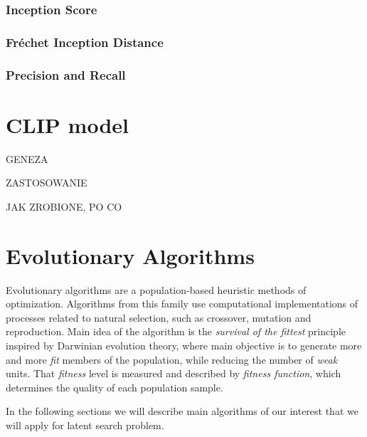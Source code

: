 \documentclass[12pt,a4paper,openany]{book}
\begin{document}



\subsubsection*{Inception Score}
\subsubsection*{Fr\'echet Inception Distance}
\subsubsection*{Precision and Recall}

\section{CLIP model}

GENEZA

ZASTOSOWANIE

JAK ZROBIONE, PO CO


\section{Evolutionary Algorithms}

Evolutionary algorithms are a population-based heuristic methods of optimization. Algorithms from this family use computational implementations of processes related to natural selection, such as crossover, mutation and reproduction. Main idea of the algorithm is the \textit{survival of the fittest} principle inspired by Darwinian evolution theory, where main objective is to generate more and more \textit{fit} members of the population, while reducing the number of \textit{weak} units. That \textit{fitness} level is measured and described by \textit{fitness function}, which determines the quality of each population sample.\

In the following sections we will describe main algorithms of our interest that we will apply for latent search problem. 
\end{document}
